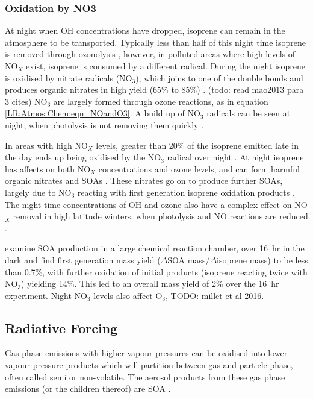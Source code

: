     \subsubsection{Oxidation by NO3}
    At night when OH concentrations have dropped, isoprene can remain in the atmosphere to be transported.
    Typically less than half of this night time isoprene is removed through ozonolysis \citep{AtkinsonArey2003}, however, in polluted areas where high levels of NO$_X$ exist, isoprene is consumed by a different radical.
    During the night isoprene is oxidised by nitrate radicals (NO$_3$), which joins to one of the double bonds and produces organic nitrates in high yield (65\% to 85\%) \citep{Mao2013}. (todo: read mao2013 para 3 cites)
    NO$_3$ are largely formed through ozone reactions, as in equation \ref{LR:Atmos:Chem:eqn_NOandO3}.
    A build up of NO$_3$ radicals can be seen at night, when photolysis is not removing them quickly \citep{Atkinson2000,Brown2009}.
    
    In areas with high NO$_X$ levels, greater than 20\% of the isoprene emitted late in the day ends up being oxidised by the NO$_3$ radical over night \citep{Brown2009}.
    At night isoprene has affects on both NO$_X$ concentrations and ozone levels, and can form harmful organic nitrates and SOAs \citep{Brown2009, Mao2013}.
    These nitrates go on to produce further SOAs, largely due to NO$_3$ reacting with first generation isoprene oxidation products \citep{Rollins2009}.
    The night-time concentrations of OH and ozone also have a complex effect on NO$_X$ removal in high latitude winters, when photolysis and NO reactions are reduced \citep{Ayers2006}.
    
    
    \cite{Rollins2009} examine SOA production in a large chemical reaction chamber, over 16~hr in the dark and find first generation mass yield ($\Delta$SOA mass$/\Delta$isoprene mass) to be less than 0.7\%, with further oxidation of initial products (isoprene reacting twice with NO$_3$) yielding 14\%.
    This led to an overall mass yield of 2\% over the 16~hr experiment.
    Night NO$_3$ levels also affect O$_3$, TODO: millet et al 2016. %
    
    
    \subsection{Radiative Forcing}
    \label{LR:VOCs:IsopCascade:SOA}
    Gas phase emissions with higher vapour pressures can be oxidised into lower vapour pressure products which will partition between gas and particle phase, often called semi or non-volatile. 
    The aerosol products from these gas phase emissions (or the children thereof) are SOA \citep{Kanakidou2005}.
    
